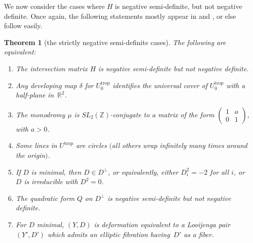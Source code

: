 \documentclass[pdftex]{sigma}
\numberwithin{equation}{section}
\numberwithin{figure}{section}
\numberwithin{table}{section}
\DeclareMathOperator{\trop}{trop}
\let\bb=\mathbb
\newtheorem{thm}{Theorem}[section]
\theoremstyle{definition}
\begin{document}
We now consider the cases where $H$ is negative semi-definite, but not negative definite. Once again, the following statements mostly appear in \cite{GHK1} and \cite{GHK2}, or else follow easily.
\begin{thm}[the strictly negative semi-definite cases]\label{The strictly negative semi-definite case}\label{NegSD}
The following are equivalent:
\begin{enumerate}\itemsep=0pt
\item[$1.$] The {intersection matrix} $H$ is negative semi-definite but not negative definite.
\item[$2.$] Any {developing map} $\delta$ for $U^{\trop}_0$ identifies the universal cover of $U^{\trop}_0$ with a half-plane in~$\bb{R}^2$.
\item[$3.$] The monodromy $\mu$ is $SL_2(\bb{Z})$-conjugate to a matrix of the form
	$\left(\begin{smallmatrix}
		1 &a \\
		0 &1
		\end{smallmatrix}\right)$,
		 with $a > 0$.
\item[$4.$] Some {lines} in $U^{\trop}$ are circles $($all others wrap infinitely many times around the origin$)$.
\item[$5.$] If $D$ is minimal, then $D \in D^{\perp}$, or equivalently, either $D_i^2 = -2$ for all $i$, or~$D$ is irreducible with $D^2=0$.
\item[$6.$] The {quadratic form} $Q$ on $D^{\perp}$ is negative semi-definite but not negative definite.
\item[$7.$] For $D$ minimal, $(Y,D)$ is deformation equivalent to a Looijenga pair $(Y',D')$ which admits an elliptic fibration having~$D'$ as a fiber.
\end{enumerate}
\end{thm}
\end{document}
